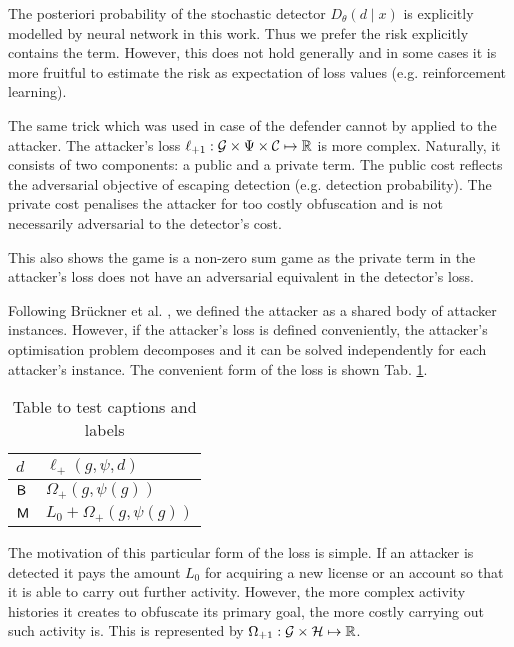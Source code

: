 The posteriori probability of the stochastic detector $D_\theta(d \mid x)$ is explicitly modelled by neural network in this work. Thus we prefer the risk explicitly contains the term. However, this does not hold generally and in some cases it is more fruitful to estimate the risk as expectation of loss values (e.g. reinforcement learning).

The same trick which was used in case of the defender cannot by applied to the attacker. The attacker's loss $\ell_{{\text{+}1}}: \mathcal{G} \times \Psi \times \mathcal{C} \mapsto \mathbb{R}$ is more complex. Naturally, it consists of two components: a public and a private term. The public cost reflects the adversarial objective of escaping detection (e.g. detection probability). The private cost penalises the attacker for too costly obfuscation and is not necessarily adversarial to the detector's cost.

This also shows the game is a non-zero sum game as the private term in the attacker's loss does not have an adversarial equivalent in the detector's loss.

Following Brückner et al. \cite{stackelberg_games}, we defined the attacker as a shared body of attacker instances. However, if the attacker's loss is defined conveniently, the attacker's optimisation problem decomposes and it can be solved independently for each attacker's instance. The convenient form of the loss is shown Tab. \ref{tab:attacker_loss}.

\begin{table}
    \centering

        \begin{tabular}{|l|l|}
            \hline
            $d$    & $\ell_\plus(g, \psi, d)$         \\ \hline
            $\mathsf{B}$ & $\Omega_\plus(g, \psi(g))$       \\ \hline
            $\mathsf{M}$ & $L_0 + \Omega_\plus(g, \psi(g))$ \\ \hline
        \end{tabular}

    \caption{Table to test captions and labels}
    \label{tab:attacker_loss}
\end{table}

The motivation of this particular form of the loss is simple. If an attacker is detected it pays the amount $L_0$ for acquiring a new license or an account so that it is able to carry out further activity. However, the more complex activity histories it creates to obfuscate its primary goal, the more costly carrying out such activity is. This is represented by $\Omega_{{\text{+}1}}: \mathcal{G} \times \mathcal{H} \mapsto \mathbb{R}$.

